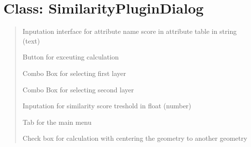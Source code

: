 \documentclass[letterpaper,10pt,english]{sphinxmanual}
\begin{document}
\section{Class: SimilarityPluginDialog}
\label{\detokenize{dialog_classes:class-similarityplugindialog}}\begin{quote}


\begin{fulllineitems}
Inputation interface for attribute name score in attribute table in string (text)

\end{fulllineitems}



\begin{fulllineitems}
Button for exceuting calculation

\end{fulllineitems}



\begin{fulllineitems}
Combo Box for selecting first layer

\end{fulllineitems}



\begin{fulllineitems}
Combo Box for selecting second layer

\end{fulllineitems}



\begin{fulllineitems}
Inputation for similarity score treshold in float (number)

\end{fulllineitems}



\begin{fulllineitems}
Tab for the main menu

\end{fulllineitems}



\begin{fulllineitems}
Check box for calculation with centering the geometry to another geometry


\end{fulllineitems}
\end{quote}
\end{document}
